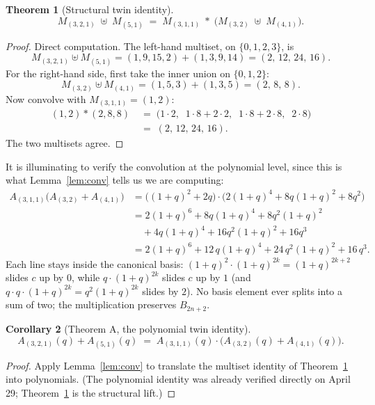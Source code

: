 \documentclass[11pt]{article}
\newtheorem{theorem}{Theorem}
\newtheorem{corollary}[theorem]{Corollary}
\theoremstyle{definition}
\begin{document}
\begin{theorem}[Structural twin identity]\label{thm:main}
\[
M_{(3,2,1)} \;\uplus\; M_{(5,1)} \;=\; M_{(3,1,1)} \;\ast\; \bigl( M_{(3,2)} \;\uplus\; M_{(4,1)} \bigr).
\]
\end{theorem}

\begin{proof}
Direct computation. The left-hand multiset, on $\{0,1,2,3\}$, is
\[
M_{(3,2,1)} \uplus M_{(5,1)} = (1,9,15,2) + (1,3,9,14) = (2,\,12,\,24,\,16).
\]
For the right-hand side, first take the inner union on $\{0,1,2\}$:
\[
M_{(3,2)} \uplus M_{(4,1)} = (1,5,3) + (1,3,5) = (2,\,8,\,8).
\]
Now convolve with $M_{(3,1,1)} = (1,2)$:
\begin{align*}
(1,2) \ast (2,8,8) \;&=\; \bigl(1\cdot 2,\;\; 1\cdot 8 + 2\cdot 2,\;\; 1\cdot 8 + 2\cdot 8,\;\; 2\cdot 8\bigr)\\
&=\; (2,\, 12,\, 24,\, 16).
\end{align*}
The two multisets agree. \qedhere
\end{proof}

\noindent It is illuminating to verify the convolution at the polynomial level, since this is what Lemma~\ref{lem:conv} tells us we are computing:
\begin{align*}
A_{(3,1,1)}\bigl(A_{(3,2)} + A_{(4,1)}\bigr)
&= \bigl((1+q)^2 + 2q\bigr) \cdot \bigl(2(1+q)^4 + 8q(1+q)^2 + 8q^2\bigr)\\
&= 2(1+q)^6 + 8q(1+q)^4 + 8q^2(1+q)^2 \\
&\quad + 4q(1+q)^4 + 16q^2(1+q)^2 + 16q^3\\
&= 2(1+q)^6 + 12\,q(1+q)^4 + 24\,q^2(1+q)^2 + 16\,q^3.
\end{align*}
Each line stays inside the canonical basis: $(1+q)^2 \cdot (1+q)^{2k} = (1+q)^{2k+2}$ slides $c$ up by $0$, while $q \cdot (1+q)^{2k}$ slides $c$ up by $1$ (and $q \cdot q \cdot (1+q)^{2k} = q^2(1+q)^{2k}$ slides by $2$). No basis element ever splits into a sum of two; the multiplication preserves $B_{2n+2}$.

\begin{corollary}[Theorem A, the polynomial twin identity]
\[
A_{(3,2,1)}(q) + A_{(5,1)}(q) \;=\; A_{(3,1,1)}(q) \cdot \bigl( A_{(3,2)}(q) + A_{(4,1)}(q) \bigr).
\]
\end{corollary}

\begin{proof}
Apply Lemma~\ref{lem:conv} to translate the multiset identity of Theorem~\ref{thm:main} into polynomials. (The polynomial identity was already verified directly on April 29; Theorem~\ref{thm:main} is the structural lift.)
\end{proof}
\end{document}
